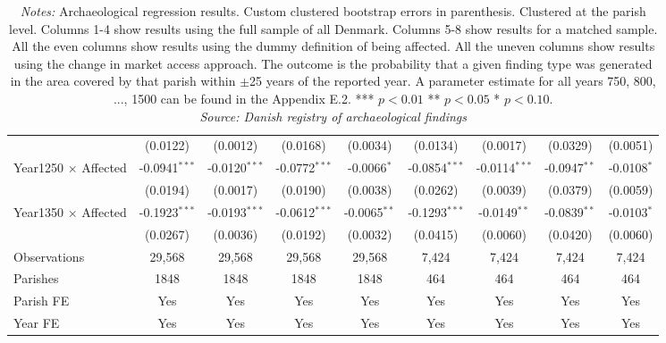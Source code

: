 \documentclass[11pt]{article}
\begin{document}
\begin{landscape}
\begin{table}
\begin{tabular}{lcccccccc}
                                                    & (0.0122)        & (0.0012)        & (0.0168)              & (0.0034)               & (0.0134)               & (0.0017)               & (0.0329)       & (0.0051)\\   
   Year1250 $\times$ Affected                       & -0.0941$^{***}$ & -0.0120$^{***}$ & -0.0772$^{***}$       & -0.0066$^{*}$          & -0.0854$^{***}$        & -0.0114$^{***}$        & -0.0947$^{**}$ & -0.0108$^{*}$\\   
                                                    & (0.0194)        & (0.0017)        & (0.0190)              & (0.0038)               & (0.0262)               & (0.0039)               & (0.0379)       & (0.0059)\\   
   Year1350 $\times$ Affected                       & -0.1923$^{***}$ & -0.0193$^{***}$ & -0.0612$^{***}$       & -0.0065$^{**}$         & -0.1293$^{***}$        & -0.0149$^{**}$         & -0.0839$^{**}$ & -0.0103$^{*}$\\   
                                                    & (0.0267)        & (0.0036)        & (0.0192)              & (0.0032)               & (0.0415)               & (0.0060)               & (0.0420)       & (0.0060)\\
   \midrule
   Observations                                     & 29,568          & 29,568          & 29,568                & 29,568                 & 7,424                  & 7,424                  & 7,424          & 7,424\\  
   Parishes                                         & 1848            & 1848            & 1848                  & 1848                   & 464                    & 464                    & 464            & 464\\
   \midrule 
   Parish FE                                        & Yes             & Yes             & Yes                   & Yes                    & Yes                    & Yes                    & Yes            & Yes\\  
   Year FE                                          & Yes             & Yes             & Yes                   & Yes                    & Yes                    & Yes                    & Yes            & Yes\\
   \midrule \midrule
\end{tabular}
\parbox{1\textwidth}{
\caption*{\footnotesize \textit{Notes:} Archaeological regression results. Custom clustered bootstrap errors in parenthesis. Clustered at the parish level. Columns 1-4 show results using the full sample of all Denmark. Columns 5-8 show results for a matched sample. All the even columns show results using the dummy definition of being affected. All the uneven columns show results using the change in market access approach. The outcome is the probability that a given finding type was generated in the area covered by that parish within $\pm$25 years of the reported year. A parameter estimate for all years 750, 800, ..., 1500 can be found in the Appendix E.2. *** $p< 0.01$ ** $p< 0.05$ * $p< 0.10$. \\ \textit{Source: Danish registry of archaeological findings}}
}
\end{table}
\end{landscape}
\end{document}
